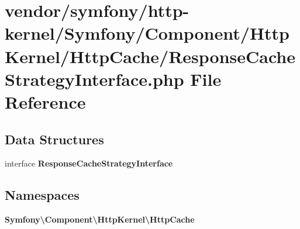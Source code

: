 \section{vendor/symfony/http-\/kernel/\+Symfony/\+Component/\+Http\+Kernel/\+Http\+Cache/\+Response\+Cache\+Strategy\+Interface.php File Reference}
\label{_response_cache_strategy_interface_8php}
\subsection*{Data Structures}
\begin{DoxyCompactItemize}
\item 
interface {\bf Response\+Cache\+Strategy\+Interface}
\end{DoxyCompactItemize}
\subsection*{Namespaces}
\begin{DoxyCompactItemize}
\item 
 {\bf Symfony\textbackslash{}\+Component\textbackslash{}\+Http\+Kernel\textbackslash{}\+Http\+Cache}
\end{DoxyCompactItemize}
